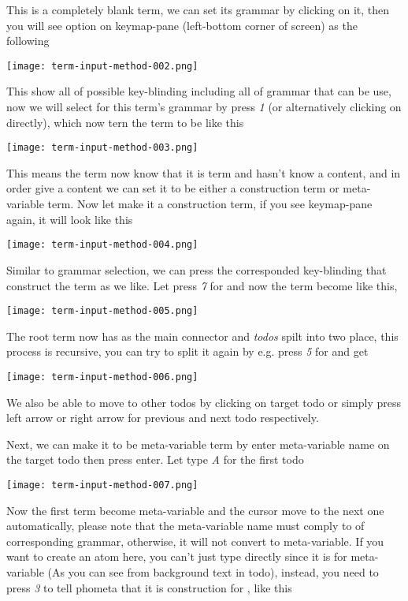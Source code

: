 \documentclass[master.tex]{subfiles}
\begin{document}
This is a completely blank term, we can set its grammar by clicking on it, then
you will see option on keymap-pane (left-bottom corner of screen) as the following

\centerline{\texttt{[image: term-input-method-002.png]}}

This show all of possible key-blinding including all of grammar that can be use,
now we will select  for this term's grammar by press \emph{1}
(or alternatively clicking on  directly), which now tern the
term to be like this

\centerline{\texttt{[image: term-input-method-003.png]}}

This means the term now know that it is  term and hasn't know a
content, and in order give a content we can set it to be either a construction
term or meta-variable term. Now let make it a construction term, if you see
keymap-pane again, it will look like this

\centerline{\texttt{[image: term-input-method-004.png]}}

Similar to grammar selection, we can press the corresponded key-blinding that
construct the term as we like. Let press \emph{7} for  and now the term become like this,

\centerline{\texttt{[image: term-input-method-005.png]}}

The root term now has \pifmt{$\rightarrow$} as the main connector and
\emph{todos} spilt into two place, this process is recursive, you can try to
split it again by e.g. press \emph{5} for  and get

\centerline{\texttt{[image: term-input-method-006.png]}}

We also be able to move to other todos by clicking on target todo or simply
press left arrow or right arrow for previous and next todo respectively.

Next, we can make it to be meta-variable term by enter meta-variable name on the
target todo then press enter. Let type \emph{A} for the first todo

\centerline{\texttt{[image: term-input-method-007.png]}}

Now the first term become meta-variable and the cursor move to the next one
automatically, please note that the meta-variable name must comply to \kVarRegex
of corresponding grammar, otherwise, it will not convert to meta-variable. If
you want to create an atom here, you can't just type directly since it is for
 meta-variable (As you can see from background text in todo),
instead, you need to press \emph{3} to tell phometa that it is construction for
, like this
\end{document}
